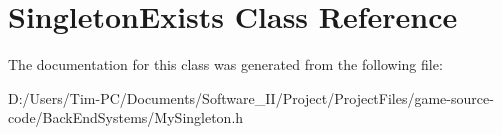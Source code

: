 \hypertarget{class_singleton_exists}{}\section{Singleton\+Exists Class Reference}
\label{class_singleton_exists}


The documentation for this class was generated from the following file\+:\begin{DoxyCompactItemize}
\item 
D\+:/\+Users/\+Tim-\/\+P\+C/\+Documents/\+Software\+\_\+\+I\+I/\+Project/\+Project\+Files/game-\/source-\/code/\+Back\+End\+Systems/My\+Singleton.\+h\end{DoxyCompactItemize}
